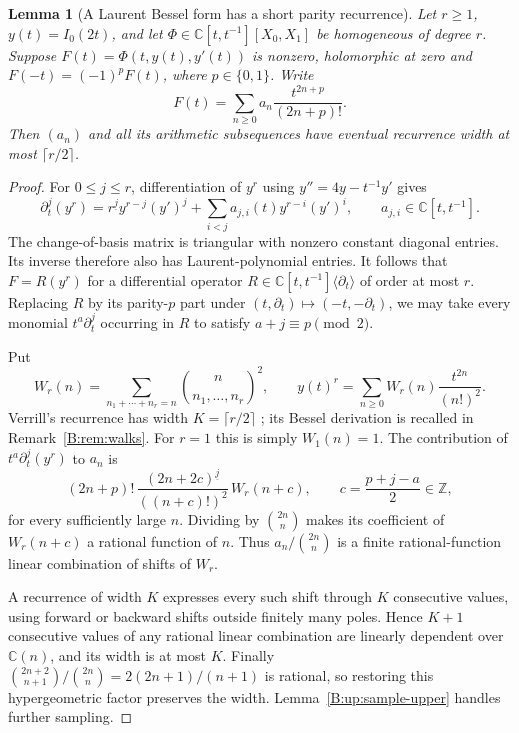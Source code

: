 \documentclass[11pt,a4paper]{article}
\newtheorem{lemma}[theorem]{Lemma}
\theoremstyle{definition}
\theoremstyle{remark}
\newcommand{\C}{\mathbb C}
\newcommand{\Z}{\mathbb Z}
\numberwithin{equation}{section}
\begin{document}
\begin{lemma}[A Laurent Bessel form has a short parity recurrence]
\label{B:up:laurent-parity}
Let $r\ge1$, $y(t)=I_0(2t)$, and let
$\Phi\in\C[t,t^{-1}][X_0,X_1]$ be homogeneous of degree $r$.
Suppose $F(t)=\Phi(t,y(t),y'(t))$ is nonzero, holomorphic at zero and
$F(-t)=(-1)^pF(t)$, where $p\in\{0,1\}$. Write
\[
 F(t)=\sum_{n\ge0}a_n\frac{t^{2n+p}}{(2n+p)!}.
\]
Then $(a_n)$ and all its arithmetic subsequences have eventual
recurrence width at most $\lceil r/2\rceil$.
\end{lemma}
\begin{proof}
For $0\le j\le r$, differentiation of $y^r$ using
$y''=4y-t^{-1}y'$ gives
\[
 \partial_t^j(y^r)
 =r^{\underline j}y^{r-j}(y')^j
   +\sum_{i<j}a_{j,i}(t)y^{r-i}(y')^i,
 \qquad a_{j,i}\in\C[t,t^{-1}].
\]
The change-of-basis matrix is triangular with nonzero constant
 diagonal entries.  Its inverse therefore also has Laurent-polynomial
entries.  It follows that $F=R(y^r)$ for a differential operator
$R\in\C[t,t^{-1}]\langle\partial_t\rangle$ of order at most $r$.
Replacing $R$ by its parity-$p$ part under
$(t,\partial_t)\mapsto(-t,-\partial_t)$, we may take every monomial
$t^a\partial_t^j$ occurring in $R$ to satisfy $a+j\equiv p\pmod2$.

Put
\[
 W_r(n)=\sum_{n_1+\cdots+n_r=n}\binom{n}{n_1,\ldots,n_r}^2,
 \qquad y(t)^r=\sum_{n\ge0}W_r(n)\frac{t^{2n}}{(n!)^2}.
\]
Verrill's recurrence has width $K=\lceil r/2\rceil$
\cite[Theorem~1 and equation~(15)]{Ver04}; its Bessel derivation
is recalled in Remark~\ref{B:rem:walks}.  For $r=1$ this is simply
$W_1(n)=1$.
The contribution of $t^a\partial_t^j(y^r)$ to $a_n$ is
\[
 (2n+p)!\,
 \frac{(2n+2c)^{\underline j}}{((n+c)!)^2}\,W_r(n+c),
 \qquad c=\frac{p+j-a}{2}\in\Z,
\]
for every sufficiently large $n$. Dividing by
$\binom{2n}{n}$ makes its coefficient of $W_r(n+c)$ a rational
function of $n$.  Thus $a_n/\binom{2n}{n}$ is a finite
rational-function linear combination of shifts of $W_r$.

A recurrence of width $K$ expresses every such shift through
$K$ consecutive values, using forward or backward shifts outside
finitely many poles.  Hence $K+1$ consecutive values of any
rational linear combination are linearly dependent over
$\C(n)$, and its width is at most $K$.  Finally
$\binom{2n+2}{n+1}/\binom{2n}{n}=2(2n+1)/(n+1)$ is rational,
so restoring this hypergeometric factor preserves the width.
Lemma~\ref{B:up:sample-upper} handles further sampling.
\end{proof}
\end{document}
